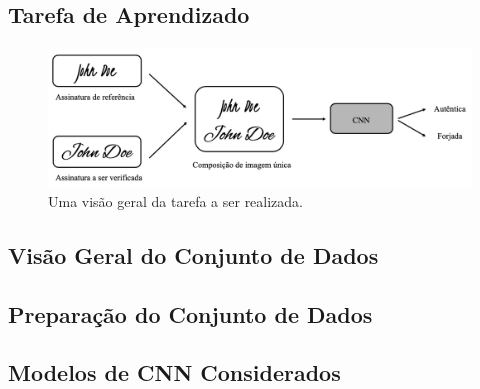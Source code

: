 
\subsection{Tarefa de Aprendizado}

\begin{figure}[h!]
\centering
\caption{Uma visão geral da tarefa a ser realizada.}
\label{fig:esquema-solucao}
\includegraphics[width=\textwidth]{imgs/esquema-solucao}
\end{figure}

\subsection{Visão Geral do Conjunto de Dados}


\subsection{Preparação do Conjunto de Dados}





\subsection{Modelos de CNN Considerados}
